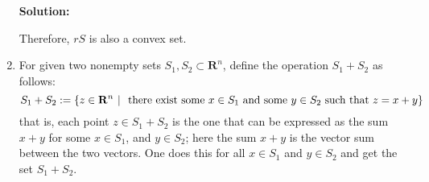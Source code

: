 \documentclass[11pt]{article}
\newenvironment{solution}
  {\par\noindent\textbf{Solution:}\par}
  {\par}
\begin{document}
\begin{enumerate}
\begin{solution}
      Therefore, $rS$ is also a convex set.
    \end{solution}

  \item For given two nonempty sets $S_1,S_2 \subset \mathbf{R}^n$, define the operation $S_1+S_2$ as follows:
    $$S_1+S_2 := \left\{ z \in \mathbf{R}^n \hspace{.05in} \vert \hspace{.05in} \text{ there exist some } x \in S_1 \text{ and some } y \in S_2 \text{ such that } z =x+y \right\}$$
    that is, each point $z \in S_1 + S_2$ is the one that can be expressed as the sum $x+y$ for some $x \in S_1$,
    and $y \in S_2$; here the sum $x+y$ is the vector sum between the two vectors. One does this for 
    all $x \in S_1$ and $y \in S_2$ and get the set $S_1 + S_2$.


\end{enumerate}
\end{document}
